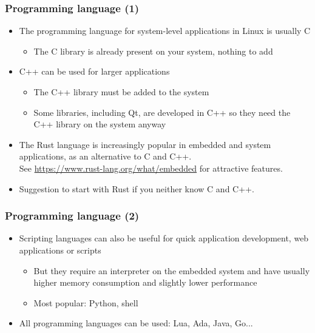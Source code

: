 \begin{frame}
  \frametitle{Programming language (1)}
  \begin{itemize}
  \item The programming language for system-level applications
    in Linux is usually C
    \begin{itemize}
    \item The C library is already present on your system, nothing to
      add
    \end{itemize}
  \item C++ can be used for larger applications
    \begin{itemize}
    \item The C++ library must be added to the system
    \item Some libraries, including Qt, are developed in C++ so they
      need the C++ library on the system anyway
    \end{itemize}
  \item The Rust language is increasingly popular in embedded
      and system applications, as an alternative to C and C++.\\
      See \url{https://www.rust-lang.org/what/embedded}
      for attractive features.
  \item Suggestion to start with Rust if you neither know
      C and C++.
  \end{itemize}
\end{frame}

\begin{frame}
  \frametitle{Programming language (2)}
  \begin{itemize}
  \item Scripting languages can also be useful for quick application
    development, web applications or scripts
    \begin{itemize}
    \item But they require an interpreter on the embedded system and
      have usually higher memory consumption and slightly lower
      performance
    \item Most popular: Python, shell
    \end{itemize}
  \item All programming languages can be used: Lua, Ada, Java, Go...
  \end{itemize}
\end{frame}


